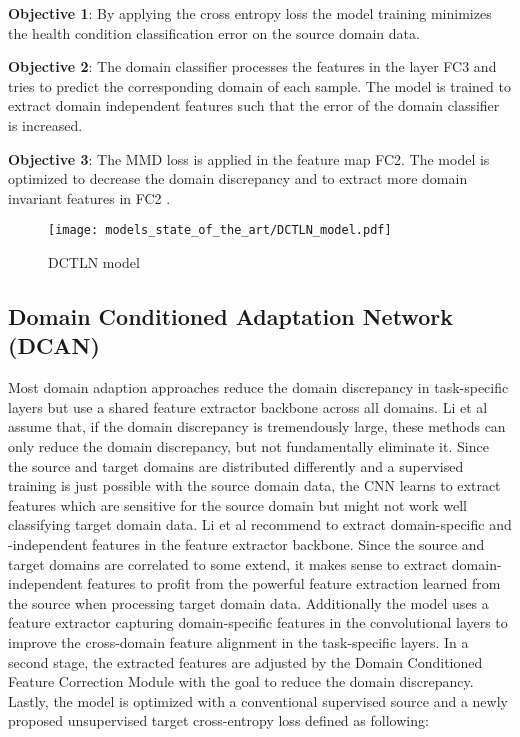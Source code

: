 \textbf{Objective 1}: By applying the cross entropy loss the model training minimizes the health condition classification error on the source domain data.

\textbf{Objective 2}: The domain classifier processes the features in the layer FC3 and tries to predict the corresponding domain of each sample. The model is trained to extract domain independent features such that the error of the domain classifier is increased.

\textbf{Objective 3}: The MMD loss is applied in the feature map FC2. The model is optimized to decrease the domain discrepancy and to extract more domain invariant features in FC2 \cite{Guo2019}. 

\begin{figure}[H]
  \centering
  \texttt{[image: models\_state\_of\_the\_art/DCTLN\_model.pdf]}
  \caption{DCTLN model \cite{Guo2019}}
  \label{fig:DCTLN_model}
\end{figure}

\subsection{Domain Conditioned Adaptation Network (DCAN)}
Most domain adaption approaches reduce the domain discrepancy in task-specific layers but use a shared feature extractor backbone across all domains. Li et al \cite{li2020} assume that, if the domain discrepancy is tremendously large, these methods can only reduce the domain discrepancy, but not fundamentally eliminate it. Since the source and target domains are distributed differently and a supervised training is just possible with the source domain data, the CNN learns to extract features which are sensitive for the source domain but might not work well classifying target domain data. Li et al recommend to extract domain-specific and -independent features in the feature extractor backbone. Since the source and target domains are correlated to some extend, it makes sense to extract domain-independent features to profit from the powerful feature extraction learned from the source when processing target domain data. Additionally the model uses a feature extractor capturing domain-specific features in the convolutional layers to improve the cross-domain feature alignment in the task-specific layers. In a second stage, the extracted features are adjusted by the Domain Conditioned Feature Correction Module with the goal to reduce the domain discrepancy. Lastly, the model is optimized with a conventional supervised source and a newly proposed unsupervised target cross-entropy loss defined as following:


